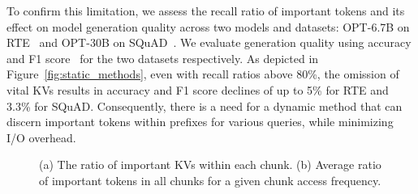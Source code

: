 
To confirm this limitation, we assess the recall ratio of important tokens and
its effect on model generation quality across two models and datasets: OPT-6.7B
on RTE~\cite{lmeval} and OPT-30B on SQuAD~\cite{squad-arxiv18}. We evaluate
generation quality using accuracy and F1 score~\cite{cachegen-sigcomm24} for the two datasets respectively. As depicted in
Figure~\ref{fig:static_methods}, even with recall ratios above 80\%, the omission
of vital KVs results in accuracy and F1 score declines of up to 5\% for RTE and
3.3\% for SQuAD.
Consequently, there is a need for a dynamic method that can discern important tokens within prefixes for various queries, while minimizing I/O overhead.


\begin{figure}
	\centering
	\hspace{0.03in}
	\vspace{-0.2in}
	\caption{
		(a) The ratio of important KVs within each chunk. 
		(b) Average ratio of important tokens in all chunks for a given chunk access frequency.}
	\label{fig:cha2}
	\vspace{-0.2in}
\end{figure}

\noindent 
{}

